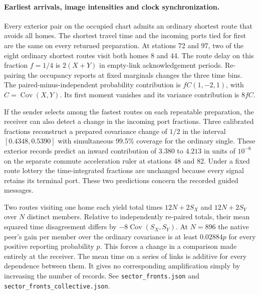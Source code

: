 \documentclass[11pt]{article}
\begin{document}
\paragraph{Earliest arrivals, image intensities and clock synchronization.}
Every exterior pair on the occupied chart admits an ordinary
shortest route that avoids all homes. The shortest travel time and
the incoming ports tied for first are the same on every returned
preparation. At stations 72 and 97, two of the eight ordinary
shortest routes visit both homes 8 and 44. The route delay on this
fraction \(f=1/4\) is \(2(X+Y)\) in empty-link acknowledgement
periods. Re-pairing the occupancy reports at fixed marginals changes
the three time bins. The paired-minus-independent probability
contribution is \(fC(1,-2,1)\), with \(C=\operatorname{Cov}(X,Y)\).
Its first moment vanishes and its variance contribution is \(8fC\).

If the sender selects among the fastest routes on each repeatable
preparation, the receiver can also detect a change in the incoming
port fractions. Three calibrated fractions reconstruct a prepared
covariance change of \(1/2\) in the interval \([0.4348,0.5390]\)
with simultaneous 99.5\% coverage for the ordinary single.
These exterior records predict an inward contribution of
\(3.380\) to \(4.213\) in units of \(10^{-6}\) on the separate
commute acceleration ruler at stations 48 and 82.
Under a fixed route lottery the time-integrated fractions are
unchanged because every signal retains its terminal port.
These two predictions concern the recorded guided messages.

Two routes visiting one home each yield total times \(12N+2S_X\)
and \(12N+2S_Y\) over \(N\) distinct members. Relative to independently
re-paired totals, their mean squared time disagreement differs by
\(-8\operatorname{Cov}(S_X,S_Y)\). At \(N=896\) the native peer's
gain per member over the ordinary covariance is at least \(0.02884p\)
for every positive reporting probability \(p\). This forces a change
in a comparison made entirely at the receiver. The mean time on
a series of links is additive for every dependence between them.
It gives no corresponding amplification simply by increasing the
number of records. See \texttt{sector\_fronts.json} and
\texttt{sector\_fronts\_collective.json}.
\end{document}

